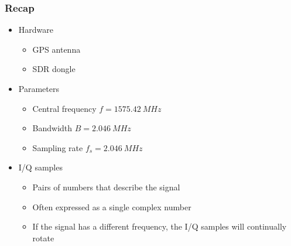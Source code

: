 \documentclass[aspectratio=169]{beamer}
\begin{document}
\begin{frame}
    \frametitle{Recap}

    \begin{itemize}
        \item<2-> Hardware
        
        \begin{itemize}
            \item GPS antenna
            
            \item SDR dongle
        \end{itemize}

        \item<3-> Parameters
        
        \begin{itemize}
            \item Central frequency $f = \qty{1575.42}{MHz}$
            
            \item Bandwidth $B = \qty{2.046}{MHz}$
            
            \item Sampling rate $f_s = \qty{2.046}{MHz}$
        \end{itemize}

        \item<4-> I/Q samples
        
        \begin{itemize}
            \item<5-> Pairs of numbers that describe the signal

            \item<6-> Often expressed as a single complex number
            
            \item<7-> If the signal has a different frequency, the I/Q samples will continually rotate
        \end{itemize}
    \end{itemize}
\end{frame}
\end{document}
